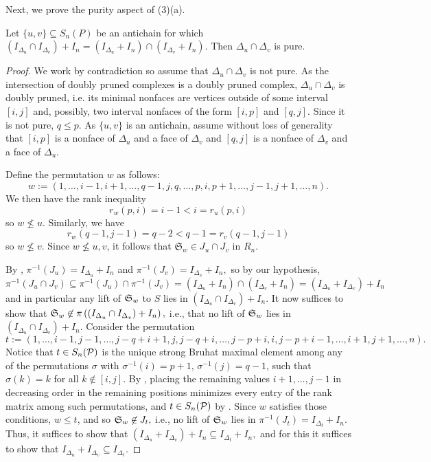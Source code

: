 Next, we prove the purity aspect of (3)(a).
\begin{lemma}
\label{lem:crossing-class-complete}
Let \(\{u,v\}\subseteq S_n(P)\) be an antichain for which $(I_{\Delta_u}\cap I_{\Delta_v}) +I_n = (I_{\Delta_u}+I_n)\cap (I_{\Delta_v}+I_n)$.
Then \(\Delta_u\cap\Delta_v\) is pure.
\end{lemma}


\begin{proof}
    We work by contradiction so assume that \(\Delta_u\cap\Delta_v\) is not pure.
    As the intersection of doubly pruned complexes is a doubly pruned complex, \(\Delta_u\cap\Delta_v\) is doubly pruned, i.e. its minimal nonfaces are vertices outside of some interval $[i,j]$ and, possibly, two interval nonfaces of the form $[i,p]$ and $[q,j]$.
    Since it is not pure, $q\leq p$.
    As $\{u,v\}$ is an antichain, assume without loss of generality that $[i,p]$ is a nonface of $\Delta_u$ and a face of $\Delta_v$ and $[q,j]$ is a nonface of $\Delta_v$ and a face of $\Delta_u$.
    
    Define the permutation $w$ as follows: 
    \[
    w :=(1,\dots,i-1,i+1,\dots,q-1,j,q,\dots,p,i,p+1,\dots,j-1,j+1,\dots,n).
    \]
    We then have the rank inequality 
    \[
    r_w(p,i) = i-1 <i = r_u(p,i)
    \]
    so $w\not\leq u$.
    Similarly, we have 
    \[
    r_w(q-1,j-1)=q-2<q-1 = r_v(q-1,j-1)
    \]
    so $w\not\leq v$.
    Since $w\not\leq u,v$, it follows that $\mathfrak{S}_w\in J_u\cap J_v$ in $R_n$.
    
    By , $\pi^{-1}(J_u) = I_{\Delta_u}+I_n$ and $\pi^{-1}(J_v) = I_{\Delta_v}+I_n,$ so by our hypothesis,
    \[
    \pi^{-1}(J_u\cap J_v) \subseteq \pi^{-1}(J_u)\cap \pi^{-1}(J_v)
    = (I_{\Delta_u}+I_n)\cap(I_{\Delta_v}+I_n) 
    = (I_{\Delta_u}+I_{\Delta_v}) + I_n
    \]
    and in particular any lift of $\mathfrak{S}_w$ to $S$ lies in $(I_{\Delta_u}\cap I_{\Delta_v})+I_n.$ 
    It now suffices to show that $\mathfrak{S}_w\not\in\pi\left((I_{\Delta_u}\cap I_{\Delta_v})+I_n\right),$ i.e., that no lift of $\mathfrak{S}_w$ lies in $(I_{\Delta_u}\cap I_{\Delta_v})+I_n.$
    Consider the permutation
    \[
    t := (1,\dots,i-1, 
    j-1,\dots,j-q+i+1,
    j, 
    j-q+i,\dots,j-p+i, 
    i, j-p+i-1,
    \dots,i+1,
    j+1,\ldots,n).
    \]
    Notice that $t\in S_n(\mathcal{P})$ is the unique strong Bruhat maximal element among any of the permutations $\sigma$ with $\sigma^{-1}(i)=p+1$, $\sigma^{-1}(j)=q-1$, such that $\sigma(k) = k$ for all $k\not\in[i,j]$. By , placing the remaining values $i+1,\ldots,j-1$ in decreasing order in the remaining positions minimizes every entry of the rank matrix among such permutations, and $t\in S_n(\mathcal{P})$ by . 
    Since $w$ satisfies those conditions, $w\leq t$, and so $\mathfrak{S}_w\not\in J_t,$ i.e., no lift of $\mathfrak{S}_w$ lies in $\pi^{-1}(J_t) = I_{\Delta_t}+I_n.$ Thus, it suffices to show that $(I_{\Delta_u}+I_{\Delta_v})+I_n\subseteq I_{\Delta_t}+I_n,$ and for this it suffices to show that $I_{\Delta_u}+I_{\Delta_v}\subseteq I_{\Delta_t}.$
    

\end{proof}
